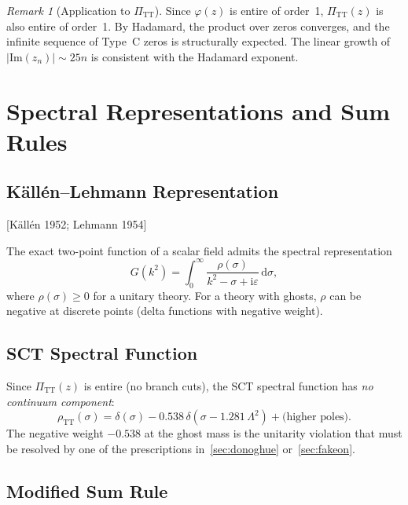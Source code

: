 \documentclass[11pt,a4paper]{article}
\theoremstyle{plain}
\theoremstyle{definition}
\theoremstyle{remark}
\newtheorem{remark}[theorem]{Remark}
\newcommand{\dd}{\mathrm{d}}
\newcommand{\ii}{\mathrm{i}}
\newcommand{\PiTT}{\Pi_{\mathrm{TT}}}
\newcommand{\fromlit}[1]{\textcolor{blue!70!black}{\textsf{[#1]}}}
\begin{document}
\begin{remark}[Application to $\PiTT$]
Since $\varphi(z)$ is entire of order~1, $\PiTT(z)$ is also entire of
order~1.  By Hadamard, the product over zeros converges, and the infinite
sequence of Type~C zeros is structurally expected.  The linear growth of
$|\mathrm{Im}(z_n)| \sim 25n$ is consistent with the Hadamard exponent.
\end{remark}


\section{Spectral Representations and Sum Rules}
\label{sec:spectral}

\subsection{K\"all\'en--Lehmann Representation}

\fromlit{K\"all\'en 1952; Lehmann 1954}

The exact two-point function of a scalar field admits the spectral
representation
\begin{equation}\label{eq:KL}
  G(k^2) = \int_0^\infty \frac{\rho(\sigma)}{k^2 - \sigma + \ii\varepsilon}
  \,\dd\sigma,
\end{equation}
where $\rho(\sigma) \geq 0$ for a unitary theory.  For a theory with
ghosts, $\rho$ can be negative at discrete points (delta functions with
negative weight).

\subsection{SCT Spectral Function}

Since $\PiTT(z)$ is entire (no branch cuts), the SCT spectral function
has \emph{no continuum component}:
\begin{equation}\label{eq:rho-SCT}
  \rho_{\mathrm{TT}}(\sigma)
  = \delta(\sigma)
    - 0.538\,\delta(\sigma - 1.281\,\Lambda^2)
    + \text{(higher poles)}.
\end{equation}
The negative weight $-0.538$ at the ghost mass is the unitarity violation
that must be resolved by one of the prescriptions in~\cref{sec:donoghue}
or~\cref{sec:fakeon}.

\subsection{Modified Sum Rule}
\end{document}

